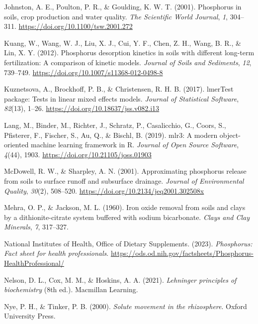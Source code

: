 \documentclass[
  a4paper,
]{article}
\newlength{\cslhangindent}
\newenvironment{CSLReferences}[2] %
 {\begin{list}{}{%
  \setlength{\itemindent}{0pt}
  \setlength{\leftmargin}{0pt}
  \setlength{\parsep}{0pt}
  \ifodd #1
   \setlength{\leftmargin}{\cslhangindent}
   \setlength{\itemindent}{-1\cslhangindent}
  \fi
  \setlength{\itemsep}{#2\baselineskip}}}
 {\end{list}}
\begin{document}
\begin{CSLReferences}{1}{0}
Johnston, A. E., Poulton, P. R., \& Goulding, K. W. T. (2001).
Phosphorus in soils, crop production and water quality. \emph{The
Scientific World Journal}, \emph{1}, 304--311.
\url{https://doi.org/10.1100/tsw.2001.272}

Kuang, W., Wang, W. J., Liu, X. J., Cui, Y. F., Chen, Z. H., Wang, B.
R., \& Lin, X. Y. (2012). Phosphorus desorption kinetics in soils with
different long-term fertilization: A comparison of kinetic models.
\emph{Journal of Soils and Sediments}, \emph{12}, 739--749.
\url{https://doi.org/10.1007/s11368-012-0498-8}

Kuznetsova, A., Brockhoff, P. B., \& Christensen, R. H. B. (2017).
lmerTest package: Tests in linear mixed effects models. \emph{Journal of
Statistical Software}, \emph{82}(13), 1--26.
\url{https://doi.org/10.18637/jss.v082.i13}

Lang, M., Binder, M., Richter, J., Schratz, P., Casalicchio, G., Coors,
S., Pfisterer, F., Fischer, S., Au, Q., \& Bischl, B. (2019). {mlr3}: A
modern object-oriented machine learning framework in {R}. \emph{Journal
of Open Source Software}, \emph{4}(44), 1903.
\url{https://doi.org/10.21105/joss.01903}

McDowell, R. W., \& Sharpley, A. N. (2001). Approximating phosphorus
release from soils to surface runoff and subsurface drainage.
\emph{Journal of Environmental Quality}, \emph{30}(2), 508--520.
\url{https://doi.org/10.2134/jeq2001.302508x}

Mehra, O. P., \& Jackson, M. L. (1960). Iron oxide removal from soils
and clays by a dithionite-citrate system buffered with sodium
bicarbonate. \emph{Clays and Clay Minerals}, \emph{7}, 317--327.

National Institutes of Health, Office of Dietary Supplements. (2023).
\emph{Phosphorus: Fact sheet for health professionals}.
\url{https://ods.od.nih.gov/factsheets/Phosphorus-HealthProfessional/}

Nelson, D. L., Cox, M. M., \& Hoskins, A. A. (2021). \emph{Lehninger
principles of biochemistry} (8th ed.). Macmillan Learning.

Nye, P. H., \& Tinker, P. B. (2000). \emph{Solute movement in the
rhizosphere}. Oxford University Press.


\end{CSLReferences}
\end{document}
